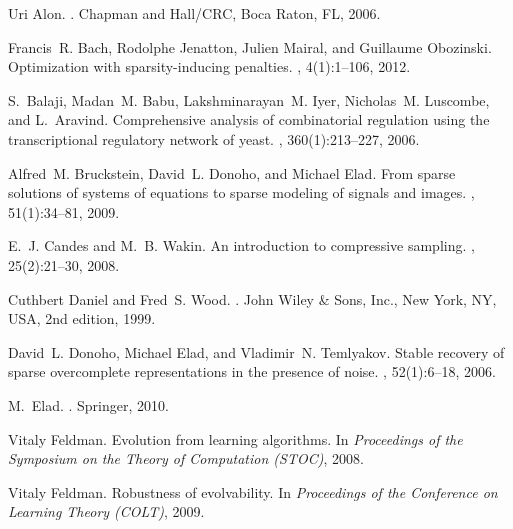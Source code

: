 \begin{thebibliography}{10}

Uri Alon.
.
\newblock Chapman and Hall/CRC, Boca Raton, FL, 2006.

Francis~R. Bach, Rodolphe Jenatton, Julien Mairal, and Guillaume Obozinski.
\newblock Optimization with sparsity-inducing penalties.
, 4(1):1--106, 2012.

S.~Balaji, Madan~M. Babu, Lakshminarayan~M. Iyer, Nicholas~M. Luscombe, and
  L.~Aravind.
\newblock Comprehensive analysis of combinatorial regulation using the
  transcriptional regulatory network of yeast.
, 360(1):213--227, 2006.

Alfred~M. Bruckstein, David~L. Donoho, and Michael Elad.
\newblock From sparse solutions of systems of equations to sparse modeling of
  signals and images.
, 51(1):34--81, 2009.

E.~J. Candes and M.~B. Wakin.
\newblock An introduction to compressive sampling.
, 25(2):21--30, 2008.

Cuthbert Daniel and Fred~S. Wood.
.
\newblock John Wiley \& Sons, Inc., New York, NY, USA, 2nd edition, 1999.

David~L. Donoho, Michael Elad, and Vladimir~N. Temlyakov.
\newblock Stable recovery of sparse overcomplete representations in the
  presence of noise.
, 52(1):6--18, 2006.

M.~Elad.
.
\newblock Springer, 2010.

Vitaly Feldman.
\newblock Evolution from learning algorithms.
\newblock In {\em Proceedings of the Symposium on the Theory of Computation
  (STOC)}, 2008.

Vitaly Feldman.
\newblock Robustness of evolvability.
\newblock In {\em Proceedings of the Conference on Learning Theory (COLT)},
  2009.


\end{thebibliography}
